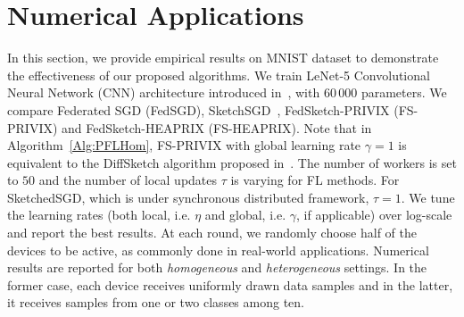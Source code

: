 \documentclass[twoside]{article}
\begin{document}


\vspace{-0.05in}
\section{Numerical Applications}\label{sec:experimnt}
\vspace{-0.05in}

In this section, we provide empirical results on MNIST dataset to demonstrate the effectiveness of our proposed algorithms. 
We train LeNet-5 Convolutional Neural Network (CNN) architecture introduced in~\cite{lecun1998gradient}, with $60\,000$ parameters.
We compare Federated SGD (FedSGD), SketchSGD~\cite{ivkin2019communication}, FedSketch-PRIVIX (FS-PRIVIX) and FedSketch-HEAPRIX (FS-HEAPRIX).
Note that in Algorithm~\ref{Alg:PFLHom}, FS-PRIVIX with global learning rate $\gamma=1$ is equivalent to the DiffSketch algorithm proposed in~\cite{li2018federated}. 
The number of workers is set to $50$ and the number of local updates $\tau$ is varying for FL methods. 
For SketchedSGD, which is under synchronous distributed framework, $\tau = 1$. 
We tune the learning rates (both local, i.e. $\eta$ and global, i.e. $\gamma$, if applicable) over log-scale and report the best results.
At each round, we randomly choose half of the devices to be active, as commonly done in real-world applications. 
Numerical results are reported for both \emph{homogeneous} and \emph{heterogeneous} settings. 
In the former case, each device receives uniformly drawn data samples and in the latter, it receives samples from one or two classes among ten. 
\end{document}
